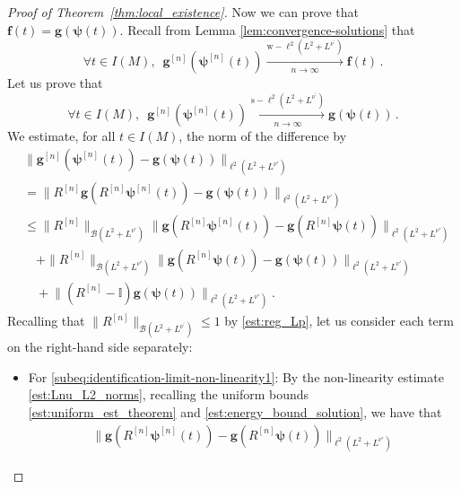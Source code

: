 \documentclass[12pt,a4paper]{amsart}
\numberwithin{equation}{section}
\newcommand{\ulg}{\boldsymbol{g}}
\newcommand{\ulpsi}{\boldsymbol{\psi}}
\newcommand{\ulf}{\boldsymbol{f}}
\begin{document}
\begin{proof}[Proof of Theorem~\ref{thm:local_existence}]
		Now we can prove that $ \ulf(t) = \ulg(\ulpsi(t)) $. Recall from Lemma \ref{lem:convergence-solutions} that
		\begin{equation}\label{lim:weak_convergence_nonlince-a}
			\forall t \in I(M), \;\ \ulg^{[n]}(\ulpsi^{[n]}(t)) \xrightarrow[n\to\infty]{\mathrm{w}-\ell^2(L^2+L^{\nu^\prime})} \ulf(t) \,.
		\end{equation}
		Let us prove that
		\begin{equation}\label{lim:weak_convergence_nonlince-b}
			\forall t \in I(M), \;\ \ulg^{[n]}(\ulpsi^{[n]}(t)) \xrightarrow[n\to\infty]{\mathrm{s}-\ell^2(L^2+L^{\nu^\prime})} \ulg(\ulpsi(t)) \,.
		\end{equation}
		We estimate, for all $ t \in I(M) $, the norm of the difference by
		\begin{subequations}
			\begin{align}
				&\big\| \ulg^{[n]}(\ulpsi^{[n]}(t)) - \ulg(\ulpsi(t)) \big\|_{\ell^2(L^2+ L^{\nu'})}\\
				&=\big\| R^{[n]} \ulg(R^{[n]}  \ulpsi^{[n]}(t)) - \ulg(\ulpsi(t)) \big\|_{\ell^2(L^2+ L^{\nu'})}  \nonumber\\
				& \leq \| R^{[n]} \|_{\mathcal{B}(L^2+L^{\nu'})}  \big\| \ulg(R^{[n]}\ulpsi^{[n]}(t) ) - \ulg( R^{[n]} \ulpsi(t) ) \big\|_{\ell^2(L^2+ L^{\nu'})} \label{subeq:identification-limit-non-linearity1}\\
				&\quad + \| R^{[n]} \|_{\mathcal{B}(L^2+L^{\nu'})}  \big\| \ulg( R^{[n]} \ulpsi(t) ) - \ulg( \ulpsi(t) ) \big\|_{\ell^2(L^2+ L^{\nu'})}  \label{subeq:identification-limit-non-linearity2}\\
				&\quad +  \big\| ( R^{[n]} - \mathbb{I}) \ulg( \ulpsi(t) ) \big\|_{\ell^2(L^2+ L^{\nu'})} . \label{subeq:identification-limit-non-linearity3}
			\end{align}
		\end{subequations}
		Recalling that $ \| R^{[n]} \|_{\mathcal{B}(L^2+L^{\nu^\prime})} \leq 1 $ by \eqref{est:reg_Lp}, let us consider each term on the right-hand side separately:
		\begin{itemize}
			\item For \eqref{subeq:identification-limit-non-linearity1}: By the non-linearity estimate \eqref{est:Lnu_L2_norms}, recalling the uniform bounds \eqref{est:uniform_est_theorem} and \eqref{est:energy_bound_solution}, we have that
			\begin{align}
				\big\| \ulg(R^{[n]}\ulpsi^{[n]}(t) ) - \ulg( R^{[n]} \ulpsi(t) ) \big\|_{\ell^2(L^2+ L^{\nu'})} 

\end{align}
\end{itemize}
\end{proof}
\end{document}
